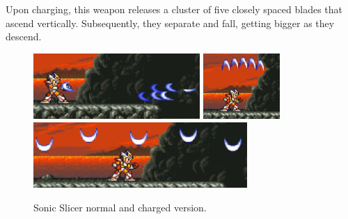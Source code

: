 Upon charging, this weapon releases a cluster of five closely spaced blades that ascend vertically. Subsequently, they separate and fall, getting bigger as they descend.
\begin{figure}[htp]
		\centering
		\includegraphics[height=2.5cm]{figures/X2/weapons/S_slicer_1.png}	
		\includegraphics[height=2.5cm]{figures/X2/weapons/S_slicer_2.png}	
		\vspace{2pt}\\
		\includegraphics[height=2.5cm]{figures/X2/weapons/S_slicer_3.png}	
	\caption{Sonic Slicer normal and charged version.}
\end{figure}

